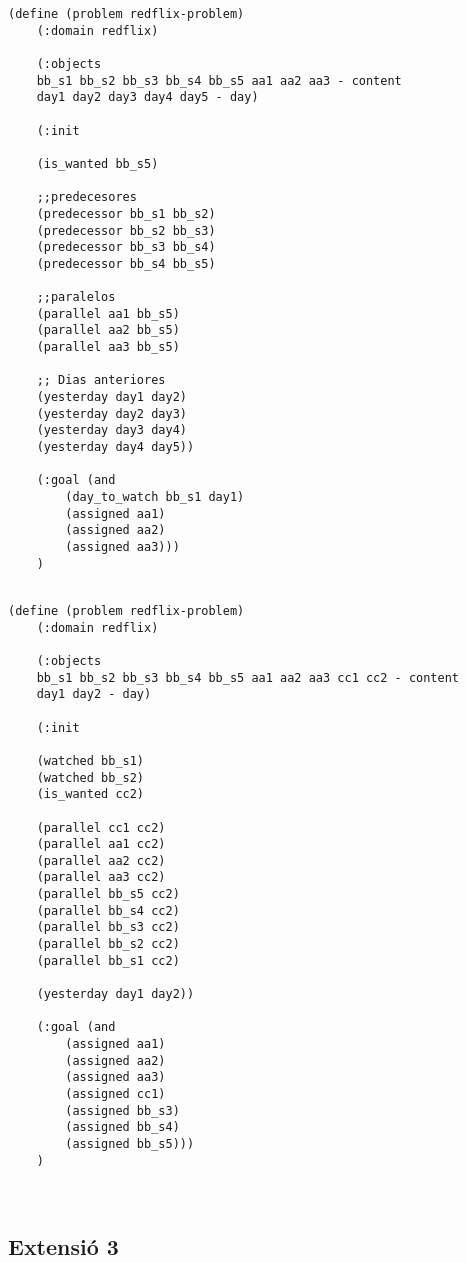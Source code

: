 \documentclass[a4paper]{article}
\begin{document}
	
	\noindent
	\begin{minipage}[t]{0.45\textwidth}
	\begin{lstlisting}[language=PDDL, caption={Joc de Prova 1 - Extensió 2}, label={lst:JP12}]                     
	(define (problem redflix-problem)
	(:domain redflix)
	
	(:objects
	bb_s1 bb_s2 bb_s3 bb_s4 bb_s5 aa1 aa2 aa3 - content
	day1 day2 day3 day4 day5 - day)

	(:init
	
	(is_wanted bb_s5)
	
	;;predecesores
	(predecessor bb_s1 bb_s2)
	(predecessor bb_s2 bb_s3)
	(predecessor bb_s3 bb_s4)
	(predecessor bb_s4 bb_s5)
	
	;;paralelos
	(parallel aa1 bb_s5)
	(parallel aa2 bb_s5)
	(parallel aa3 bb_s5)
	
	;; Dias anteriores
	(yesterday day1 day2)
	(yesterday day2 day3)
	(yesterday day3 day4)
	(yesterday day4 day5))
	
	(:goal (and
		(day_to_watch bb_s1 day1)
		(assigned aa1)
		(assigned aa2)
		(assigned aa3)))
	)
	
	\end{lstlisting}
		
	\end{minipage}
	\hfill
	\begin{minipage}[t]{0.45\textwidth}
	\begin{lstlisting}[language=PDDL, caption={Joc de Prova 2 - Extensió 2}, label={lst:JP22}]                     
	(define (problem redflix-problem)
	(:domain redflix)
	
	(:objects
	bb_s1 bb_s2 bb_s3 bb_s4 bb_s5 aa1 aa2 aa3 cc1 cc2 - content
	day1 day2 - day)
	
	(:init

	(watched bb_s1)
	(watched bb_s2)
	(is_wanted cc2)
	
	(parallel cc1 cc2)
	(parallel aa1 cc2)
	(parallel aa2 cc2)
	(parallel aa3 cc2)
	(parallel bb_s5 cc2)
	(parallel bb_s4 cc2)
	(parallel bb_s3 cc2)
	(parallel bb_s2 cc2)
	(parallel bb_s1 cc2)
	
	(yesterday day1 day2))
	
	(:goal (and
		(assigned aa1)
		(assigned aa2)
		(assigned aa3)
		(assigned cc1)
		(assigned bb_s3)
		(assigned bb_s4)
		(assigned bb_s5)))
	)
	
	
		\end{lstlisting}
	\end{minipage}
	
	
	\subsection{Extensió 3}
	
\end{document}
